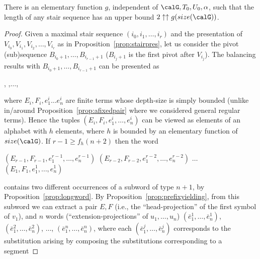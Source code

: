 \documentclass[12pt]{article}
\begin{document}
\begin{prop}\label{prop:boundstairsequence}
There is an elementary function $g$,
independent of $\calG, T_0, U_0, \alpha$,
such that the length of any stair sequence 
has an upper bound 
$2\uparrow\uparrow g(size(\calG))$. 
\end{prop}

\begin{proof} 
Given a maximal stair sequence $(i_0, i_1, \dots , i_r)$
and the presentation of $V_{i_0},V_{i_1},V_{i_2},\dots, V_{i_r}$ as in
Proposition~\ref{prop:stairpres},
let us
consider the pivot (sub)sequence $B_{i_0+1},\dots, B_{i_{r-1}+1}$
($B_{i_j+1}$ is the first pivot after $V_{i_{j}}$).
The balancing results with 
$B_{i_0+1},\dots, B_{i_{r-1}+1}$
can be presented as 

,
,$\dots$,

\smallskip
\noindent
where $E_i,F_i,e^i_1 \dots e^i_n$ are finite terms
whose depth-size is simply bounded 
(unlike
in/around Proposition~\ref{prop:afixedpair}
where we considered general regular terms).
Hence 
the tuples $(E_i,F_i,e^i_1, \dots, e^i_n)$ can be viewed as
elements of an alphabet with $h$ elements, where 
$h$ is bounded by an elementary function of $size(\calG)$.
If $r{-}1\geq f_h(n{+}2)$ then the word
\begin{center}
$(E_{r-1},F_{r-1},e^{r-1}_1,\dots,e^{r-1}_n)$
$(E_{r-2},F_{r-2},e^{r-2}_1,\dots,e^{r-2}_n)$
$\dots$
$(E_1,F_1,e^1_1,\dots,e^1_n)$
\end{center}
contains two different occurrences  
of a subword of type $n{+}1$, 
by Proposition~\ref{prop:longword}.
By Proposition~\ref{prop:prefixyielding},
from this subword we can extract a pair $E,F$ (i.e., the
``head-projection'' of the first symbol of $v_1$),
and  $n$ words (``extension-projections'' of $u_1,\dots,u_n$)
$(\bar{e}^1_1, \dots, \bar{e}^1_n)$,
 $(\bar{e}^2_1, \dots, \bar{e}^2_n)$, $\dots$,
  $(\bar{e}^n_1, \dots, \bar{e}^n_n)$, where each 
$(\bar{e}^j_1, \dots, \bar{e}^j_n)$ corresponds to the substitution
arising by composing the substitutions corresponding to a segment
\end{proof}
\end{document}
